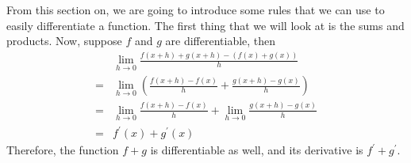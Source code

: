 From this section on, we are going to introduce some rules that we can use to easily differentiate a function. The first thing that we will look at is the sums and products. Now, suppose $f$ and $g$ are differentiable, then
\begin{align*}
    &\lim_{h\to0}\frac{f(x+h)+g(x+h)-(f(x)+g(x))}{h}\\
    =&\lim_{h\to0}(\frac{f(x+h)-f(x)}{h}+\frac{g(x+h)-g(x)}{h})\\
    =&\lim_{h\to0}\frac{f(x+h)-f(x)}{h}+\lim_{h\to0}\frac{g(x+h)-g(x)}{h}\\
    =&f^\prime(x)+g^\prime(x)
\end{align*}
Therefore, the function $f+g$ is differentiable as well, and its derivative is $f^\prime+g^\prime$.